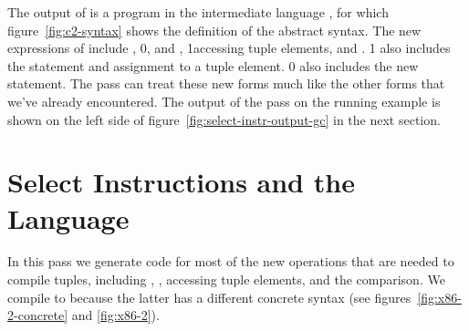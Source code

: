 \documentclass[7x10]{TimesAPriori_MIT}%
\def\racketEd{0}
\def\pythonEd{1}
\def\edition{1}
\newcommand{\racket}[1]{{\if\edition\racketEd{#1}\fi}}
\newcommand{\pythonColor}[0]{}
\newcommand{\python}[1]{{\if\edition\pythonEd\pythonColor #1\fi}}
\numberwithin{theorem}{chapter}
\numberwithin{definition}{chapter}
\numberwithin{equation}{chapter}
\begin{document}
The output of  is a program in the
intermediate language \LangCVec{}, for which figure~\ref{fig:c2-syntax}
shows the definition of the abstract syntax.
%
%
The new expressions of \LangCVec{} include ,
%
\racket{, and ,}
%
\python{accessing tuple elements,}
%
and .
%
\python{\LangCVec{} also includes the  statement and
assignment to a tuple element.}
%
\racket{\LangCVec{} also includes the new \code{collect} statement.}
%
The  pass can treat these new forms much like
the other forms that we've already encountered.  The output of the
 pass on the running example is shown on the
left side of figure~\ref{fig:select-instr-output-gc} in the next
section.


\section{Select Instructions and the \LangXGlobal{} Language}
\label{sec:select-instructions-gc}


In this pass we generate {\ArchName} code for most of the new operations that
are needed to compile tuples, including ,
, accessing tuple elements, and the 
comparison.
%
We compile  to  because the latter has a
different concrete syntax (see figures~\ref{fig:x86-2-concrete} and
\ref{fig:x86-2}).  
\end{document}
